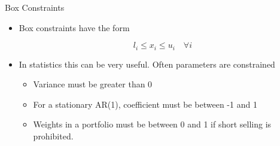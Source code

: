 \documentclass[10pt]{beamer}
\begin{document}
                                                                                              \begin{frame}{Box Constraints}
                                                                                                \begin{itemize}
                                                                                                \item Box constraints have the form

                                                                                                  \begin{equation}
                                                                                                    l_i\leq x_i \leq u_i\quad\forall i
                                                                                                  \end{equation}

                                                                                                \item In statistics this can be very useful.  Often parameters are constrained
                                                                                                  \begin{itemize}
                                                                                                  \item Variance must be greater than 0
                                                                                                  \item For a stationary AR(1), coefficient must be between -1 and 1
                                                                                                  \item Weights in a portfolio must be between 0 and 1 if short selling is prohibited.
                                                                                                  \end{itemize}
                                                                                                \end{itemize}
                                                                                              \end{frame}
\end{document}
